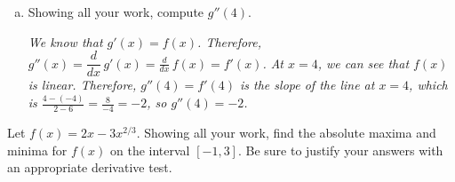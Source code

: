 \documentclass[12pt,letterpaper]{exam}
\begin{document}
\begin{questions}
\begin{enumerate}[(a)]
\item Showing all your work, compute $g''(4)$. 

{\itshape We know that $g'(x)= f(x)$. Therefore, $g''(x)= \dfrac{d}{dx} \, g'(x)= \frac{d}{dx} \, f(x)= f'(x)$. At $x= 4$, we can see that $f(x)$ is linear. Therefore, $g''(4)= f'(4)$ is the slope of the line at $x= 4$, which is $\frac{4 - (-4)}{2 - 6}= \frac{8}{-4}= -2$, so $g''(4)= -2$.}
\end{enumerate}



\newpage
{} \par\vspace{0.3cm}

Let $f(x)= 2x - 3x^{2/3}$. Showing all your work, find the absolute maxima and minima for $f(x)$ on the interval $[-1, 3]$. Be sure to justify your answers with an appropriate derivative test. \pspace


\end{questions}
\end{document}
